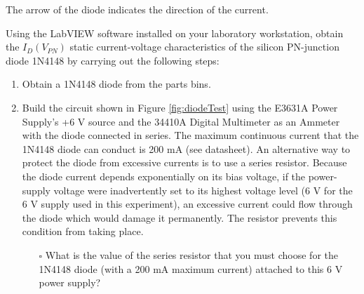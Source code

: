 \documentclass[12pt]{../manual}
\begin{document}
The arrow of the diode indicates the direction of the current.

Using the LabVIEW software installed on your laboratory workstation, obtain the $I_D(V_{PN})$ static current-voltage characteristics of the silicon PN-junction diode 1N4148 by carrying out the following steps:
\begin{enumerate}
\item Obtain a 1N4148 diode from the parts bins.
\item Build the circuit shown in Figure \ref{fig:diodeTest} using the E3631A Power Supply's +6 V source and the 34410A Digital Multimeter as an Ammeter with the diode connected in series. The maximum continuous current that the 1N4148 diode can conduct is 200 mA (see datasheet). An alternative way to protect the diode from excessive currents is to use a series resistor. Because the diode current depends exponentially on its bias voltage, if the power-supply voltage were inadvertently set to its highest voltage level (6 V for the 6 V supply used in this experiment), an excessive current could flow through the diode which would damage it permanently. The resistor prevents this condition from taking place. 

\begin{itemize}
\item[$\square$] What is the value of the series resistor that you must choose for the 1N4148 diode (with a 200 mA maximum current) attached to this 6 V power supply?
\end{itemize}


\end{enumerate}
\end{document}
